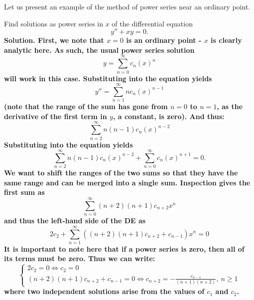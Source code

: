 \documentclass{article}
\begin{document}
Let us present an example of the method of power series near an ordinary point. 
\begin{example}
    Find solutions as power series in $x$ of the differential equation
    \begin{equation*}
        y''+xy=0.
    \end{equation*}
    \bf Solution. \normalfont First, we note that $x=0$ is an ordinary point - $x$ is clearly analytic here. As such, the usual power series solution 
    \begin{equation*}
        y=\sum_{n=0}^{\infty} c_n(x)^n
    \end{equation*}
    will work in this case. Substituting into the equation yields 
    \begin{equation*}
        y''=\sum_{n=1}^{\infty} nc_n(x)^{n-1}
    \end{equation*}
    (note that the range of the sum has gone from $n=0$ to $n=1$, as the derivative of the first term in $y$, a constant, is zero). And thus:
    \begin{equation*}
        \sum_{n=2}^{\infty} n(n-1)c_n(x)^{n-2}
    \end{equation*}
    Substituting into the equation yields
    \begin{equation*}
        \sum_{n=2}^{\infty} n(n-1)c_n(x)^{n-2}+ \sum_{n=0}^{\infty} c_n(x)^{n+1} = 0.
    \end{equation*}
    We want to shift the ranges of the two sums so that they have the same range and can be merged into a single sum. Inspection gives the first sum as 
    \begin{equation*}
        \sum_{n=0}^{\infty} (n+2)(n+1)c_{n+2}x^n
    \end{equation*}
    and thus the left-hand side of the DE as 
    \begin{equation*}
        2c_2 + \sum_{n=1}^{\infty}((n+2)(n+1)c_{n+2}+c_{n-1})x^n = 0
    \end{equation*}
    It is important to note here that if a power series is zero, then all of its terms must be zero. Thus we can write: 
    \begin{equation*}
        \begin{cases}
            2c_2=0 \iff c_2 = 0 \\
            (n+2)(n+1)c_{n+2}+c_{n-1} = 0 \iff c_{n+2}=-\frac{c_{n-1}}{(n+1)(n+2)},\ n\geq 1
        \end{cases}
    \end{equation*}
    where two independent solutions arise from the values of $c_1$ and $c_2$.
\end{example}
\end{document}
